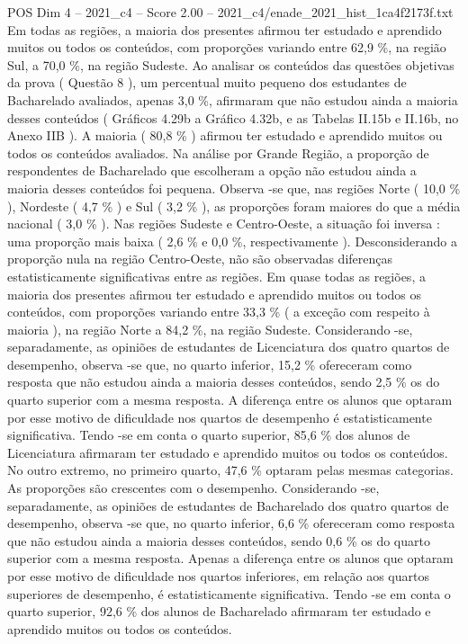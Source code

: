 \begin{textsample}{POS Dim 4 – 2021\_c4 – Score 2.00 – 2021\_c4/enade\_2021\_hist\_1ca4f2173f.txt}
Em todas as regiões, a maioria dos presentes afirmou ter estudado e aprendido muitos ou todos os conteúdos, com proporções variando entre 62,9 \%, na região Sul, a 70,0 \%, na região Sudeste.
Ao analisar os conteúdos das questões objetivas da prova ( Questão 8 ), um percentual muito pequeno dos estudantes de Bacharelado avaliados, apenas 3,0 \%, afirmaram que não estudou ainda a maioria desses conteúdos ( Gráficos 4.29b a Gráfico 4.32b, e as Tabelas II.15b e II.16b, no Anexo IIB ).
A maioria ( 80,8 \% ) afirmou ter estudado e aprendido muitos ou todos os conteúdos avaliados.
Na análise por Grande Região, a proporção de respondentes de Bacharelado que escolheram a opção não estudou ainda a maioria desses conteúdos foi pequena.
Observa -se que, nas regiões Norte ( 10,0 \% ), Nordeste ( 4,7 \% ) e Sul ( 3,2 \% ), as proporções foram maiores do que a média nacional ( 3,0 \% ).
Nas regiões Sudeste e Centro-Oeste, a situação foi inversa : uma proporção mais baixa ( 2,6 \% e 0,0 \%, respectivamente ).
Desconsiderando a proporção nula na região Centro-Oeste, não são observadas diferenças estatisticamente significativas entre as regiões.
Em quase todas as regiões, a maioria dos presentes afirmou ter estudado e aprendido muitos ou todos os conteúdos, com proporções variando entre 33,3 \% ( a exceção com respeito à maioria ), na região Norte a 84,2 \%, na região Sudeste.
Considerando -se, separadamente, as opiniões de estudantes de Licenciatura dos quatro quartos de desempenho, observa -se que, no quarto inferior, 15,2 \% ofereceram como resposta que não estudou ainda a maioria desses conteúdos, sendo 2,5 \% os do quarto superior com a mesma resposta.
A diferença entre os alunos que optaram por esse motivo de dificuldade nos quartos de desempenho é estatisticamente significativa.
Tendo -se em conta o quarto superior, 85,6 \% dos alunos de Licenciatura afirmaram ter estudado e aprendido muitos ou todos os conteúdos.
No outro extremo, no primeiro quarto, 47,6 \% optaram pelas mesmas categorias.
As proporções são crescentes com o desempenho.
Considerando -se, separadamente, as opiniões de estudantes de Bacharelado dos quatro quartos de desempenho, observa -se que, no quarto inferior, 6,6 \% ofereceram como resposta que não estudou ainda a maioria desses conteúdos, sendo 0,6 \% os do quarto superior com a mesma resposta.
Apenas a diferença entre os alunos que optaram por esse motivo de dificuldade nos quartos inferiores, em relação aos quartos superiores de desempenho, é estatisticamente significativa.
Tendo -se em conta o quarto superior, 92,6 \% dos alunos de Bacharelado afirmaram ter estudado e aprendido muitos ou todos os conteúdos.

\end{textsample}
